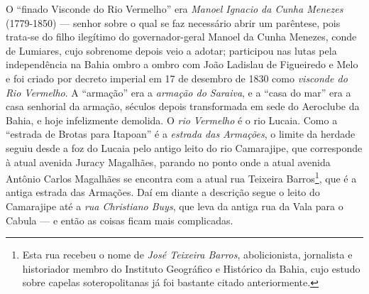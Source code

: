 O ``finado Visconde do Rio Vermelho'' era \textit{Manoel Ignacio da Cunha Menezes} (1779-1850) --- senhor sobre o qual se faz necessário abrir um parêntese, pois trata-se do filho ilegítimo do governador-geral Manoel da Cunha Menezes, conde de Lumiares, cujo sobrenome depois veio a adotar; participou nas lutas pela independência na Bahia ombro a ombro com João Ladislau de Figueiredo e Melo e foi criado por decreto imperial em 17 de desembro de 1830 como \textit{visconde do Rio Vermelho}. A ``armação'' era a \textit{armação do Saraiva}, e a ``casa do mar'' era a casa senhorial da armação, séculos depois transformada em sede do Aeroclube da Bahia, e hoje infelizmente demolida. O \textit{rio Vermelho} é o rio Lucaia. Como a ``estrada de Brotas para Itapoan'' é a \textit{estrada das Armações}, o limite da herdade seguiu desde a foz do Lucaia pelo antigo leito do rio Camarajipe, que corresponde à atual avenida Juracy Magalhães, parando no ponto onde a atual avenida Antônio Carlos Magalhães se encontra com a atual rua Teixeira Barros\footnote{Esta rua recebeu o nome de \textit{José Teixeira Barros}, abolicionista, jornalista e historiador membro do Instituto Geográfico e Histórico da Bahia, cujo estudo sobre capelas soteropolitanas já foi bastante citado anteriormente.}, que é a antiga estrada das Armações. Daí em diante a descrição segue o leito do Camarajipe até a \textit{rua Christiano Buys}, que leva da antiga rua da Vala para o Cabula --- e então as coisas ficam mais complicadas.

